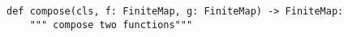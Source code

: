 \begin{verbatim}
def compose(cls, f: FiniteMap, g: FiniteMap) -> FiniteMap:
    """ compose two functions"""
\end{verbatim}